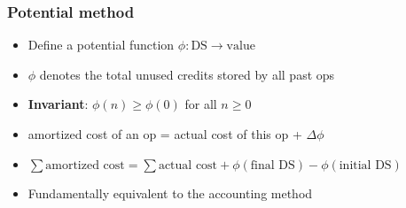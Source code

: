\documentclass[10pt]{article}
\begin{document}
\subsubsection{Potential method}

\begin{itemize}
	\item Define a potential function $\phi : \text{DS} \rightarrow \text{value}$
	\item $\phi$ denotes the total unused credits stored by all past ops
	\item \textbf{Invariant}: $\phi(n) \ge \phi(0)$ for all $n \ge 0$
	\item amortized cost of an op = actual cost of this op + $\Delta \phi$
	\item $\sum{\text{amortized cost}} = \sum{\text{actual cost}} + \phi(\text{final DS}) - \phi(\text{initial DS})$
	\item Fundamentally equivalent to the accounting method
\end{itemize}
\end{document}
